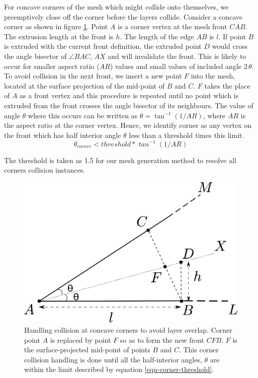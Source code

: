 \documentclass[conf]{new-aiaa}
\begin{document}
For concave corners of the mesh which might collide onto themselves, we preemptively close off the corner before the layers collide. Consider a concave corner as shown in figure \ref{fig-cornerCollision}. Point $A$ is a corner vertex at the mesh front $CAB$. The extrusion length at the front is $h$. The length of the edge $AB$ is $l$. If point $B$ is extruded with the current front definition, the extruded point $D$ would cross the angle bisector of $\angle BAC$, $AX$ and will invalidate the front. This is likely to occur for smaller aspect ratio ($AR$)  values and small values of included angle $2 \, \theta$. To avoid collision in the next front, we insert a new point $F$ into the mesh, located at the surface projection of the mid-point of $B$ and $C$. $F$ takes the place of $A$ as a front vertex and this procedure is repeated until no point which is extruded from the front crosses the angle bisector of its neighbours. The value of angle $\theta$ where this occurs can be written as $\theta = \tan^{-1}(1/AR)$, where $AR$ is the aspect ratio at the corner vertex. Hence, we identify corner as any vertex on the front which has half interior angle $\theta$ less than a threshold times this limit.
\begin{equation}
\mathit{\theta_{corner} < threshold * \tan^{-1}(1/AR)}
\label{eqn-corner-threshold}
\end{equation}

The threshold is taken as 1.5 for our mesh generation method to resolve all corners collision instances.

\begin{figure}
\centering
\includegraphics[scale=0.4]{cornerCollision/cornerCollision.eps}
\caption{Handling collision at concave corners to avoid layer overlap. Corner point $A$ is replaced by point $F$ so as to form the new front $CFB$. $F$ is the surface-projected mid-point of points $B$ and $C$. This corner collision handling is done until all the half-interior angles, $\theta$ are within the limit described by equation \ref{eqn-corner-threshold}.}
\label{fig-cornerCollision}
\end{figure}
\end{document}
